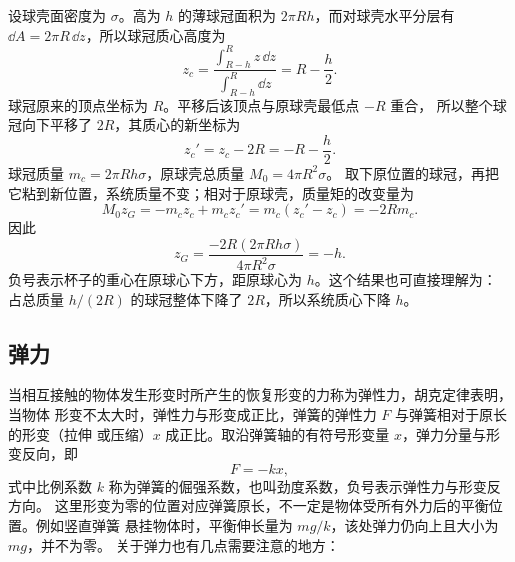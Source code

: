 \documentclass[UTF8,zihao=-4,oneside,openany]{ctexbook}
\newenvironment{xesolution}{%
  \par\smallskip
  \begingroup\small
  \noindent{\bfseries\color{DeepBlue}解答}\quad
}{%
  \par\endgroup\medskip
}
\begin{document}
\begin{xesolution}
设球壳面密度为 $\sigma$。高为 $h$ 的薄球冠面积为 $2\pi Rh$，而对球壳水平分层有
$\dd A=2\pi R\,\dd z$，所以球冠质心高度为
\[
  z_c=\frac{\int_{R-h}^{R}z\,\dd z}{\int_{R-h}^{R}\dd z}
  =R-\frac h2.
\]
球冠原来的顶点坐标为 $R$。平移后该顶点与原球壳最低点 $-R$ 重合，
所以整个球冠向下平移了 $2R$，其质心的新坐标为
\[
  z_c'=z_c-2R=-R-\frac h2.
\]
球冠质量 $m_c=2\pi Rh\sigma$，原球壳总质量 $M_0=4\pi R^2\sigma$。
取下原位置的球冠，再把它粘到新位置，系统质量不变；相对于原球壳，质量矩的改变量为
\[
  M_0z_G=-m_cz_c+m_cz_c'
  =m_c(z_c'-z_c)=-2Rm_c.
\]
因此
\[
  z_G=\frac{-2R(2\pi Rh\sigma)}{4\pi R^2\sigma}
  =\boxed{-h}.
\]
负号表示杯子的重心在原球心下方，距原球心为 $h$。这个结果也可直接理解为：
占总质量 $h/(2R)$ 的球冠整体下降了 $2R$，所以系统质心下降 $h$。
\end{xesolution}

\subsection{弹力}

当相互接触的物体发生形变时所产生的恢复形变的力称为弹性力，胡克定律表明，当物体
形变不太大时，弹性力与形变成正比，弹簧的弹性力 $F$ 与弹簧相对于原长的形变（拉伸
或压缩）$x$ 成正比。取沿弹簧轴的有符号形变量 $x$，弹力分量与形变反向，即
\begin{equation}
  F=-kx,
\end{equation}
式中比例系数 $k$ 称为弹簧的倔强系数，也叫劲度系数，负号表示弹性力与形变反方向。
这里形变为零的位置对应弹簧原长，不一定是物体受所有外力后的平衡位置。例如竖直弹簧
悬挂物体时，平衡伸长量为 $mg/k$，该处弹力仍向上且大小为 $mg$，并不为零。
关于弹力也有几点需要注意的地方：
\end{document}
